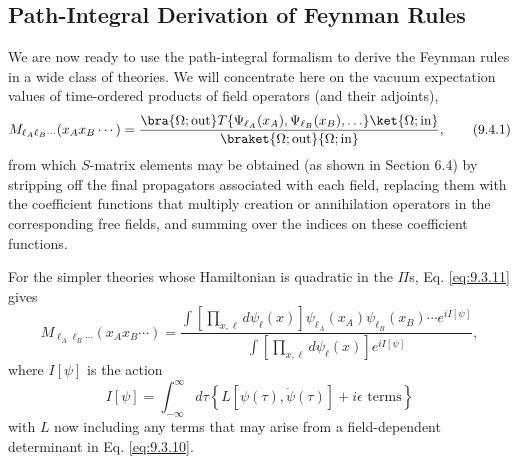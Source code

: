 
\subsection{Path-Integral Derivation of Feynman Rules}

We are now ready to use the path-integral formalism to derive the Feynman
rules in a wide class of theories. We will concentrate here on the vacuum
expectation values of time-ordered products of field operators (and their
adjoints),
\begin{equation}
M_{\ell_A\ell_B\cdots}(x_Ax_B\cdots)
=\frac{\bra{\Omega;\mathrm{out}}T\{\Psi_{\ell_A}(x_A),
 \Psi_{\ell_B}(x_B),\ldots\}\ket{\Omega;\mathrm{in}}}
 {\braket{\Omega;\mathrm{out}}{\Omega;\mathrm{in}}},
\tag{9.4.1}\label{eq:9.4.1}
\end{equation}
from which $S$-matrix elements may be obtained (as shown in Section 6.4) by
stripping off the final propagators associated with each field, replacing them
with the coefficient functions that multiply creation or annihilation
operators in the corresponding free fields, and summing over the indices on
these coefficient functions.

For the simpler theories whose Hamiltonian is quadratic in the $\Pi$s,
Eq. \eqref{eq:9.3.11} gives
\begin{equation}
M_{\ell_A\ell_B\cdots}(x_Ax_B\cdots)
=\frac{\displaystyle\int\left[\prod_{x,\ell}d\psi_\ell(x)\right]
 \psi_{\ell_A}(x_A)\psi_{\ell_B}(x_B)\cdots e^{iI[\psi]}}
 {\displaystyle\int\left[\prod_{x,\ell}d\psi_\ell(x)\right]e^{iI[\psi]}},
\tag{9.4.2}\label{eq:9.4.2}
\end{equation}
where $I[\psi]$ is the action
\begin{equation}
I[\psi]=\int_{-\infty}^{\infty}d\tau
 \left\{L[\psi(\tau),\dot\psi(\tau)]+i\epsilon\text{ terms}\right\}
\tag{9.4.3}\label{eq:9.4.3}
\end{equation}
with $L$ now including any terms that may arise from a field-dependent
determinant in Eq. \eqref{eq:9.3.10}.

